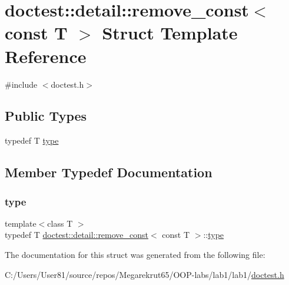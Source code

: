 \hypertarget{structdoctest_1_1detail_1_1remove__const_3_01const_01_t_01_4}{}\section{doctest\+:\+:detail\+:\+:remove\+\_\+const$<$ const T $>$ Struct Template Reference}
\label{structdoctest_1_1detail_1_1remove__const_3_01const_01_t_01_4}


{\ttfamily \#include $<$doctest.\+h$>$}

\subsection*{Public Types}
\begin{DoxyCompactItemize}
\item 
typedef T \mbox{\hyperlink{structdoctest_1_1detail_1_1remove__const_3_01const_01_t_01_4_ab1e642665bafaad4023fba5295290b17}{type}}
\end{DoxyCompactItemize}


\subsection{Member Typedef Documentation}
\mbox{\label{structdoctest_1_1detail_1_1remove__const_3_01const_01_t_01_4_ab1e642665bafaad4023fba5295290b17}} 
\subsubsection{\texorpdfstring{type}{type}}
{\footnotesize\ttfamily template$<$class T $>$ \\
typedef T \mbox{\hyperlink{structdoctest_1_1detail_1_1remove__const}{doctest\+::detail\+::remove\+\_\+const}}$<$ const T $>$\+::\mbox{\hyperlink{structdoctest_1_1detail_1_1remove__const_3_01const_01_t_01_4_ab1e642665bafaad4023fba5295290b17}{type}}}



The documentation for this struct was generated from the following file\+:\begin{DoxyCompactItemize}
\item 
C\+:/\+Users/\+User81/source/repos/\+Megarekrut65/\+O\+O\+P-\/labs/lab1/lab1/\mbox{\hyperlink{doctest_8h}{doctest.\+h}}\end{DoxyCompactItemize}
